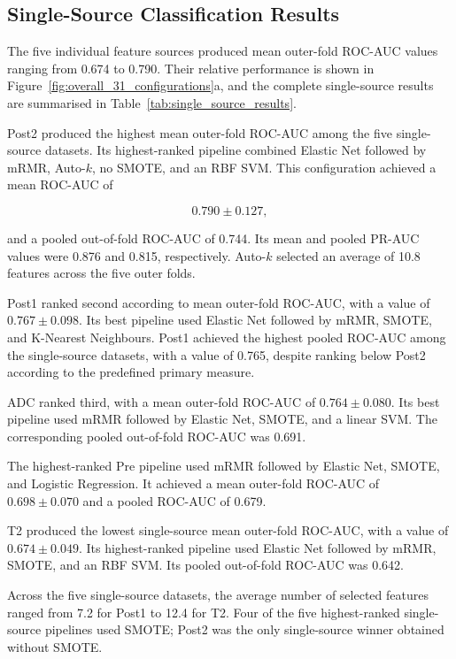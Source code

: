 \documentclass[12pt,twocolumn]{article}
\begin{document}
\subsection{Single-Source Classification Results}
\label{subsec:single_source_results}

The five individual feature sources produced mean outer-fold ROC-AUC
values ranging from 0.674 to 0.790. Their relative performance is
shown in Figure~\ref{fig:overall_31_configurations}a, and the complete
single-source results are summarised in
Table~\ref{tab:single_source_results}.

Post2 produced the highest mean outer-fold ROC-AUC among the five
single-source datasets. Its highest-ranked pipeline combined Elastic
Net followed by mRMR, Auto-\(k\), no SMOTE, and an RBF SVM. This
configuration achieved a mean ROC-AUC of

\begin{equation}
0.790 \pm 0.127,
\end{equation}

and a pooled out-of-fold ROC-AUC of 0.744. Its mean and pooled PR-AUC
values were 0.876 and 0.815, respectively. Auto-\(k\) selected an
average of 10.8 features across the five outer folds.

Post1 ranked second according to mean outer-fold ROC-AUC, with a value
of \(0.767 \pm 0.098\). Its best pipeline used Elastic Net followed by
mRMR, SMOTE, and K-Nearest Neighbours. Post1 achieved the highest
pooled ROC-AUC among the single-source datasets, with a value of 0.765,
despite ranking below Post2 according to the predefined primary
measure.

ADC ranked third, with a mean outer-fold ROC-AUC of
\(0.764 \pm 0.080\). Its best pipeline used mRMR followed by Elastic
Net, SMOTE, and a linear SVM. The corresponding pooled out-of-fold
ROC-AUC was 0.691.

The highest-ranked Pre pipeline used mRMR followed by Elastic Net,
SMOTE, and Logistic Regression. It achieved a mean outer-fold ROC-AUC
of \(0.698 \pm 0.070\) and a pooled ROC-AUC of 0.679.

T2 produced the lowest single-source mean outer-fold ROC-AUC, with a
value of \(0.674 \pm 0.049\). Its highest-ranked pipeline used Elastic
Net followed by mRMR, SMOTE, and an RBF SVM. Its pooled out-of-fold
ROC-AUC was 0.642.

Across the five single-source datasets, the average number of selected
features ranged from 7.2 for Post1 to 12.4 for T2. Four of the five
highest-ranked single-source pipelines used SMOTE; Post2 was the only
single-source winner obtained without SMOTE.
\end{document}
